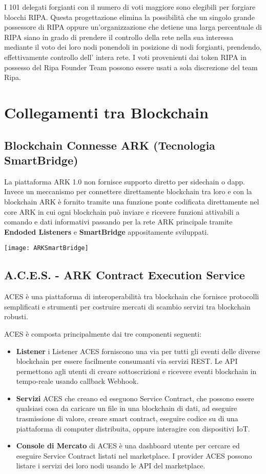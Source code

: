 \documentclass[11pt,fleqn,oneside]{book} %
\begin{document}
I 101 delegati forgianti con il numero di voti maggiore sono elegibili per forgiare blocchi
RIPA. Questa progettazione elimina la possibilità che un singolo grande possessore di
RIPA oppure un'organizzazione che detiene una larga percentuale di RIPA siano in grado
di prendere il controllo della rete nella sua interessa mediante il voto dei loro nodi
ponendoli in posizione di nodi forgianti, prendendo, effettivamente controllo dell'
intera rete. I voti provenienti dai token RIPA in possesso del Ripa Founder Team
possono essere usati a sola discrezione del team Ripa.

\section{Collegamenti tra Blockchain}
\subsection{Blockchain Connesse ARK (Tecnologia SmartBridge)}
La piattaforma ARK 1.0 non fornisce supporto diretto per sidechain o dapp. Invece
un meccanismo per connettere direttamente blockchain tra loro e con la blockchain ARK
è fornito tramite una funzione ponte codificata direttamente nel core ARK in cui
ogni blockchain può inviare e ricevere funzioni attivabili a comando e dati
informativi passando per la rete ARK principale tramite \textbf{Endoded Listeners}
e \textbf{SmartBridge} appositamente sviluppati.
\begin{center}
	\texttt{[image: ARKSmartBridge]}
\end{center}

\subsection{A.C.E.S. - ARK Contract Execution Service}
ACES è una piattaforma di interoperabilità tra blockchain che fornisce protocolli semplificati
e strumenti per costruire mercati di scambio servizi tra blockchain robusti.

ACES è composta principalmente dai tre componenti seguenti:
\begin{itemize}
	\item \textbf{Listener} i Listener ACES forniscono una via per tutti gli eventi delle diverse
	blockchain per essere facilmente consumanti via servizi REST. Le API permettono agli utenti
	di creare sottoscrizioni e ricevere eventi blockchain in tempo-reale usando callback Webhook.
	\item \textbf{Servizi} ACES che creano ed eseguono Service Contract, che possono essere qualsiasi
	cosa da caricare un file in una blockchain di dati, ad eseguire trasmissione di valore,
	creare smart contract, eseguire codice su di una piattaforma di computer distribuita, oppure
	interagire con dispositivi IoT.
	\item \textbf{Console di Mercato} di ACES è una dashboard utente per cercare ed eseguire Service
	Contract listati nel marketplace. I provider ACES possono listare i servizi dei loro nodi 
	usando le API del marketplace.
\end{itemize}
\end{document}

